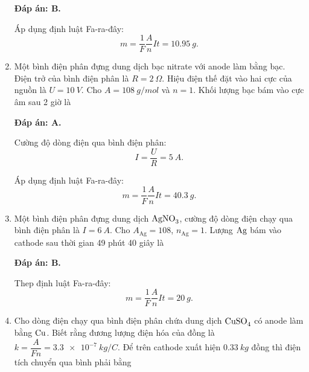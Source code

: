 \begin{enumerate}[label=\bfseries Câu \arabic*:]
{	}
	\loigiai
	{	\textbf{Đáp án: B.}
		
		Áp dụng định luật Fa-ra-đây:
		$$m=\dfrac{1}{F} \dfrac{A}{n} I t = \SI{10.95}{g}.$$
	}
	\item {}
	
	\cauhoi
	{Một bình điện phân đựng dung dịch bạc nitrate với anode làm bằng bạc. Điện trở của bình điện phân là $R=\SI{2}{\Omega}$. Hiệu điện thế đặt vào hai cực của nguồn là $U=\SI{10}{V}$. Cho $A=\SI{108}{g/mol}$ và $n=1$. Khối lượng bạc bám vào cực âm sau 2 giờ là
		
	}
	\loigiai
	{	\textbf{Đáp án: A.}
		
		Cường độ dòng điện qua bình điện phân:
		$$I=\dfrac{U}{R} = \SI{5}{A}.$$
		
		Áp dụng định luật Fa-ra-đây:
		$$m=\dfrac{1}{F} \dfrac{A}{n} I t = \SI{40.3}{g}.$$
	}
	\item {}
	
	\cauhoi
	{Một bình điện phân đựng dung dịch $\ce{AgNO_3}$, cường độ dòng điện chạy qua bình điện phân là $I=\SI{6}{A}$. Cho $A_\text{Ag} = 108$, $n_\text{Ag} = 1$. Lượng $\ce{Ag}$ bám vào cathode sau thời gian 49 phút 40 giây là
		
	}
	\loigiai
	{	\textbf{Đáp án: B.}
		
		Thep định luật Fa-ra-đây:
		$$m=\dfrac{1}{F} \dfrac{A}{n} I t = \SI{20}{g}.$$
	}
	\item {}
	
	\cauhoi
	{Cho dòng điện chạy qua bình điện phân chứa dung dịch $\ce{CuSO_4}$ có anode làm bằng $\ce{Cu}$. Biết rằng đương lượng điện hóa của đồng là $k=\dfrac{A}{Fn} = \SI{3.3e-7}{kg/C}$. Để trên cathode xuất hiện $\SI{0.33}{kg}$ đồng thì điện tích chuyển qua bình phải bằng
		
}
\end{enumerate}
